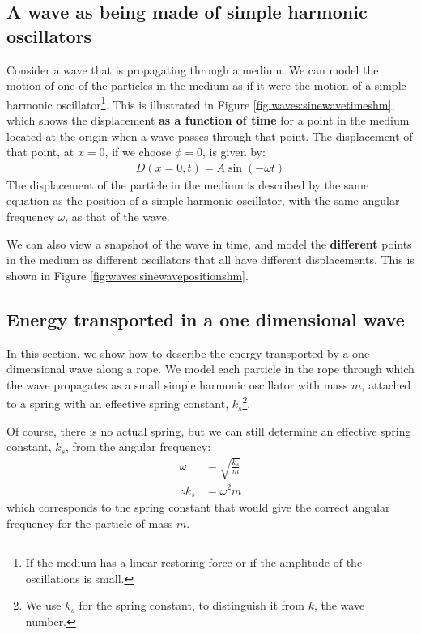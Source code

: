 \subsection{A wave as being made of simple harmonic oscillators}
Consider a wave that is propagating through a medium. We can model the motion of one of the particles in the medium as if it were the motion of a simple harmonic oscillator\footnote{If the medium has a linear restoring force or if the amplitude of the oscillations is small.}. This is illustrated in Figure \ref{fig:waves:sinewavetimeshm}, which shows the displacement \textbf{as a function of time} for a point in the medium located at the origin when a wave passes through that point. The displacement of that point, at $x=0$, if we choose $\phi=0$, is given by:
\begin{align*}
D(x=0,t) = A\sin(-\omega t)
\end{align*}
The displacement of the particle in the medium is described by the same equation as the position of a simple harmonic oscillator, with the same angular frequency $\omega$, as that of the wave. 

We can also view a snapshot of the wave in time, and model the \textbf{different} points in the medium as different oscillators that all have different displacements. This is shown in Figure \ref{fig:waves:sinewavepositionshm}.

\subsection{Energy transported in a one dimensional wave}
In this section, we show how to describe the energy transported by a one-dimensional wave along a rope. We model each particle in the rope through which the wave propagates as a small simple harmonic oscillator with mass $m$, attached to a spring with an effective spring constant, $k_s$\footnote{We use $k_s$ for the spring constant, to distinguish it from $k$, the wave number.}.

Of course, there is no actual spring, but we can still determine an effective spring constant, $k_s$, from the angular frequency:
\begin{align*}
\omega &= \sqrt{\frac{k_s}{m}}\\
\therefore k_s &= \omega^2 m
\end{align*}
which corresponds to the spring constant that would give the correct angular frequency for the particle of mass $m$.

